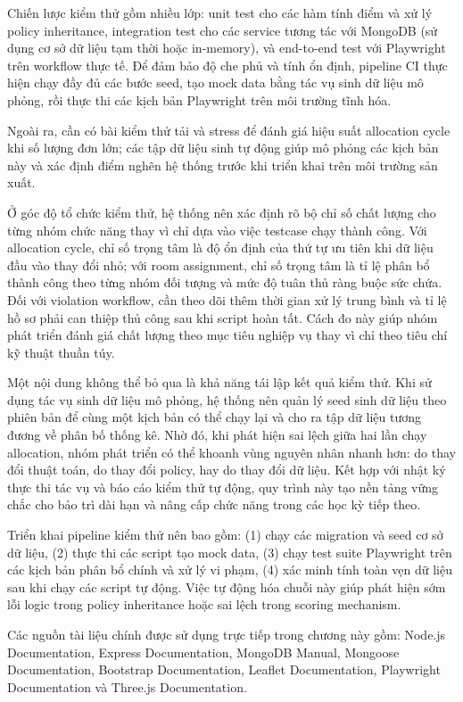 Chiến lược kiểm thử gồm nhiều lớp: unit test cho các hàm tính điểm và xử lý policy inheritance, integration test cho các service tương tác với MongoDB (sử dụng cơ sở dữ liệu tạm thời hoặc in-memory), và end-to-end test với Playwright trên workflow thực tế. Để đảm bảo độ che phủ và tính ổn định, pipeline CI thực hiện chạy đầy đủ các bước seed, tạo mock data bằng tác vụ sinh dữ liệu mô phỏng, rồi thực thi các kịch bản Playwright trên môi trường tĩnh hóa.

Ngoài ra, cần có bài kiểm thử tải và stress để đánh giá hiệu suất allocation cycle khi số lượng đơn lớn; các tập dữ liệu sinh tự động giúp mô phỏng các kịch bản này và xác định điểm nghẽn hệ thống trước khi triển khai trên môi trường sản xuất.

Ở góc độ tổ chức kiểm thử, hệ thống nên xác định rõ bộ chỉ số chất lượng cho từng nhóm chức năng thay vì chỉ dựa vào việc testcase chạy thành công. Với allocation cycle, chỉ số trọng tâm là độ ổn định của thứ tự ưu tiên khi dữ liệu đầu vào thay đổi nhỏ; với room assignment, chỉ số trọng tâm là tỉ lệ phân bổ thành công theo từng nhóm đối tượng và mức độ tuân thủ ràng buộc sức chứa. Đối với violation workflow, cần theo dõi thêm thời gian xử lý trung bình và tỉ lệ hồ sơ phải can thiệp thủ công sau khi script hoàn tất. Cách đo này giúp nhóm phát triển đánh giá chất lượng theo mục tiêu nghiệp vụ thay vì chỉ theo tiêu chí kỹ thuật thuần túy.

Một nội dung không thể bỏ qua là khả năng tái lập kết quả kiểm thử. Khi sử dụng tác vụ sinh dữ liệu mô phỏng, hệ thống nên quản lý seed sinh dữ liệu theo phiên bản để cùng một kịch bản có thể chạy lại và cho ra tập dữ liệu tương đương về phân bố thống kê. Nhờ đó, khi phát hiện sai lệch giữa hai lần chạy allocation, nhóm phát triển có thể khoanh vùng nguyên nhân nhanh hơn: do thay đổi thuật toán, do thay đổi policy, hay do thay đổi dữ liệu. Kết hợp với nhật ký thực thi tác vụ và báo cáo kiểm thử tự động, quy trình này tạo nền tảng vững chắc cho bảo trì dài hạn và nâng cấp chức năng trong các học kỳ tiếp theo.

Triển khai pipeline kiểm thử nên bao gồm: (1) chạy các migration và seed cơ sở dữ liệu, (2) thực thi các script tạo mock data, (3) chạy test suite Playwright trên các kịch bản phân bổ chính và xử lý vi phạm, (4) xác minh tính toàn vẹn dữ liệu sau khi chạy các script tự động. Việc tự động hóa chuỗi này giúp phát hiện sớm lỗi logic trong policy inheritance hoặc sai lệch trong scoring mechanism.

\bigskip
Các nguồn tài liệu chính được sử dụng trực tiếp trong chương này gồm: Node.js Documentation, Express Documentation, MongoDB Manual, Mongoose Documentation, Bootstrap Documentation, Leaflet Documentation, Playwright Documentation và Three.js Documentation.
